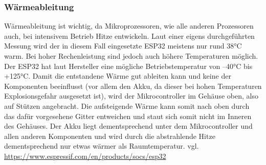 \documentclass[]{article}
\begin{document}
\subsubsection{Wärmeableitung}
Wärmeableitung ist wichtig, da Mikroprozessoren, wie alle anderen Prozessoren auch, bei intensivem Betrieb Hitze entwickeln. Laut einer eigens durchgeführten Messung wird der in diesem Fall eingesetzte ESP32 meistens nur rund 38°C warm. Bei hoher Rechenleistung sind jedoch auch höhere Temperaturen möglich. Der ESP32 hat laut Hersteller eine mögliche Betriebstemperatur von –40°C bis +125°C. Damit die entstandene Wärme gut ableiten kann und keine der Komponenten beeinflusst (vor allem den Akku, da dieser bei hohen Temperaturen Explosionsgefahr ausgesetzt ist), wird der Mikrocontroller im Gehäuse oben, also auf Stützen angebracht. Die aufsteigende Wärme kann somit nach oben durch das dafür vorgesehene Gitter entweichen und staut sich somit nicht im Inneren des Gehäuses. Der Akku liegt dementsprechend unter dem Mikrocontroller und allen anderen Komponenten und wird durch die abstrahlende Hitze dementsprechend nur etwas wärmer als Raumtemperatur.
\vspace{4mm}\newline
vgl. \url{https://www.espressif.com/en/products/socs/esp32}
\end{document}
